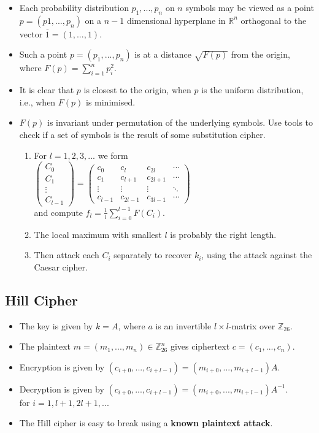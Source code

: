 \documentclass[a4paper]{scrartcl}
\begin{document}
\begin{itemize}
\item Each probability distribution $p_1, ..., p_n$ on $n$ symbols may be viewed as a point $p = (p1, ..., p_n)$ on a $n - 1$ dimensional hyperplane in $\mathbb{R}^n$ orthogonal to the vector $\overline{1} = (1, ..., 1)$.
\item Such a point $p = (p_1, ..., p_n)$ is at a distance $\sqrt{F(p)}$ from the origin, where $F(p) = \sum^{n}_{i = 1} p^2_i$.
\item It is clear that $p$ is closest to the origin, when $p$ is the uniform distribution, i.e., when $F(p)$ is minimised.
\item $F(p)$ is invariant under permutation of the underlying symbols. Use tools to check if a set of symbols is the result of some substitution cipher. 
\begin{enumerate}
\item For $l = 1, 2, 3, ...$ we form\\[0.25cm] 
$
\begin{pmatrix}
C_{0} \\
C_{1} \\
\vdots \\
C_{l-1} 
\end{pmatrix} 
=
\begin{pmatrix}
c_{0} & c_{l} & c_{2l} & \cdots \\
c_{1} & c_{l+1} & c_{2l+1} & \cdots \\
\vdots  & \vdots  & \vdots & \ddots \\
c_{l-1} & c_{2l-1} & c_{3l-1} & \cdots 
\end{pmatrix}$\\[0.25cm]
and compute $f_l = \frac{1}{l} \sum^{l-1}_{i=0}F(C_i)$.
\item The local maximum with smallest $l$ is probably the right length.
\item Then attack each $C_i$ separately to recover $k_i$, using the attack against the Caesar cipher.
\end{enumerate}
\end{itemize}

\subsection*{Hill Cipher}

\begin{itemize}
\item The key is given by $k = A$, where $a$ is an invertible $l \times l$-matrix over $\mathbb{Z}_{26}$.
\item The plaintext $m = (m_1, ..., m_n) \in \mathbb{Z}_{26}^{n}$ gives ciphertext $c = (c_1, ..., c_n)$.
\item Encryption is given by $(c_{i+0}, ..., c_{i+l-1}) = (m_{i+0}, ..., m_{i+l-1})A$.
\item Decryption is given by $(c_{i+0}, ..., c_{i+l-1}) = (m_{i+0}, ..., m_{i+l-1})A^{-1}$.\\[0.25cm]
for $i = 1, l + 1, 2l + 1, ...$
\item The Hill cipher is easy to break using a \textbf{known plaintext attack}.
\end{itemize}
\end{document}
